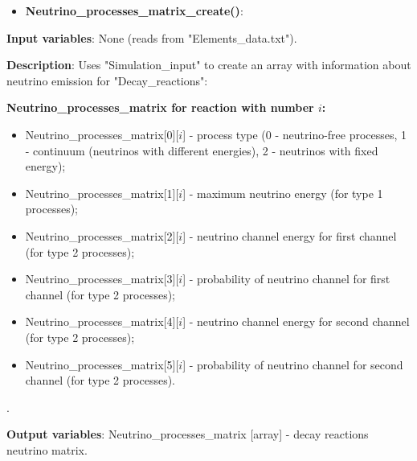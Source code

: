 \documentclass[a4paper,12pt]{article}
\newcommand{\namefunction}[4]{
  \begin{itemize}
    \item \textbf{#1}:
  \end{itemize}
  
  \textbf{Input variables}: #2.
  
  \textbf{Description}: #3.
  
  \textbf{Output variables}: #4.
}
\begin{document}
\vspace{1em}

\namefunction{Neutrino\_processes\_matrix\_create()}{None (reads from "Elements\_data.txt")}{Uses "Simulation\_input" to create an array with information about neutrino emission for "Decay\_reactions":

\textbf{Neutrino\_processes\_matrix for reaction with number $i$:}
\begin{itemize}
    \item Neutrino\_processes\_matrix[0][$i$] - process type (0 - neutrino-free processes, 1 - continuum (neutrinos with different energies), 2 - neutrinos with fixed energy);
    \item Neutrino\_processes\_matrix[1][$i$] - maximum neutrino energy (for type 1 processes);
    \item Neutrino\_processes\_matrix[2][$i$] - neutrino channel energy for first channel (for type 2 processes);
    \item Neutrino\_processes\_matrix[3][$i$] - probability of neutrino channel for first channel (for type 2 processes);
    \item Neutrino\_processes\_matrix[4][$i$] - neutrino channel energy for second channel (for type 2 processes);
    \item Neutrino\_processes\_matrix[5][$i$] - probability of neutrino channel for second channel (for type 2 processes).
\end{itemize}

}{Neutrino\_processes\_matrix [array] - decay reactions neutrino matrix}

\vspace{1em}
\end{document}
